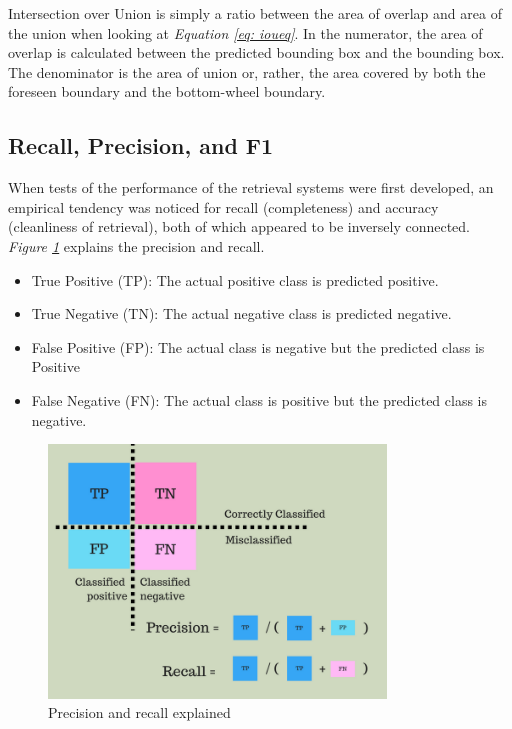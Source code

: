 Intersection over Union is simply a ratio between the area of overlap and area of the union when looking at \textit{Equation \ref{eq: ioueq}}.
In the numerator, the area of overlap is calculated between the predicted bounding box and the bounding box.
The denominator is the area of union or, rather, the area covered by both the foreseen boundary and the bottom-wheel boundary\cite{uavs_comparing_2019}.
\subsection{Recall, Precision, and F1}
When tests of the performance of the retrieval systems were first developed, an empirical tendency was noticed for recall (completeness) and accuracy (cleanliness of retrieval), both of which appeared to be inversely connected\cite{buckland_relationship_1994}. \textit{Figure \ref{fig:precisionrecall}} explains the precision and recall.



\begin{itemize}
    \item True Positive (TP): The actual positive class is predicted positive.
    \item True Negative (TN): The actual negative class is predicted negative.
    \item False Positive (FP): The actual class is negative but the predicted class is Positive
    \item False Negative (FN): The actual class is positive but the predicted class is negative.
\end{itemize}

\begin{figure}[h]
    \centering
    \includegraphics[width=0.8\textwidth]{graphics/Precisionrecall.png}
    \caption{Precision and recall explained \cite{mittapally_whats_2019}}
    \label{fig:precisionrecall}
\end{figure}



